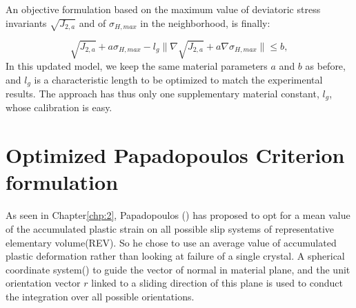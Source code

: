 An objective formulation based on the maximum value of deviatoric stress invariants $\sqrt{J_{2,a}}$ and of $\sigma_{H,max}$ in the neighborhood, is finally:

\begin{equation}
	\sqrt{J_{2,a}}+a\sigma_{H,max}-l_g\parallel{\nabla\sqrt{J_{2,a}}}+a\nabla{\sigma_{H,max}}\parallel\leqslant b ,
	\label{modified Crossland}
\end{equation}
In this updated model, we keep the same material parameters $a$ and $b$ as before, and $l_g$ is a characteristic length to be optimized to match the experimental results. The approach has thus only one supplementary material constant, $l_g$, whose calibration is easy.

\section{Optimized Papadopoulos Criterion formulation}
As seen in Chapter\ref{chp:2}, Papadopoulos (\cite{papadopoulos1993fatigue}) has proposed to opt for a mean value of the accumulated plastic strain on all possible slip systems of representative elementary volume(REV). So he chose to use an average value  of accumulated plastic deformation rather than looking at failure of a single crystal. A spherical coordinate system() to guide the vector of normal in material plane, and the unit orientation vector $r$ linked to a sliding direction of this plane is used to conduct the integration over all possible orientations.

